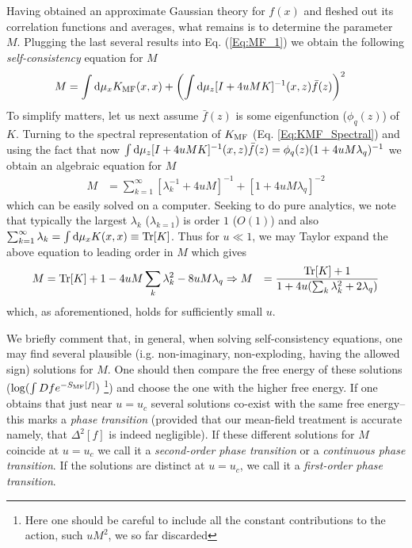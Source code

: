 Having obtained an approximate Gaussian theory for $f(x)$ and fleshed out its correlation functions and averages, what remains is to determine the parameter $M$. Plugging the last several results into Eq. (\ref{Eq:MF_1}) we obtain the following {\it self-consistency} equation for $M$ 
\begin{align}
M &= \int \text{d}\mu_{x} K_{\text{MF}}(x,x)+\left(\int \text{d}\mu_{z} [I+4uMK]^{-1}(x,z) \bar{f}(z)\right)^2
\end{align}
To simplify matters, let us next assume $\bar{f}(z)$ is some eigenfunction ($\phi_q(z)$) of $K$. Turning to the spectral representation of $K_{\text{MF}}$ (Eq. \ref{Eq:KMF_Spectral}) and using the fact that now $\int \text{d}\mu_{z} [I+4uMK]^{-1}(x,z) \bar{f}(z)=\phi_q(z) (1+4uM \lambda_q)^{-1}$ we obtain an  algebraic equation for $M$  
\begin{align}
M &= \sum_{k=1}^{\infty}[ \lambda_k^{-1} + 4u M]^{-1}+ [1+4uM \lambda_q]^{-2}
\end{align}
which can be easily solved on a computer. Seeking to do pure analytics, we note that typically the largest $\lambda_k$ ($\lambda_{k=1}$) is order $1$ ($O(1)$) and also $\sum_{k=1}^{\infty} \lambda_k=\int \text{d}\mu_x K(x,x)\equiv \text{Tr}[K]$. Thus for $u \ll 1$, we may Taylor expand the above equation to leading order in $M$ which gives 
\begin{align}
M &= \text{Tr}[K]+1 - 4uM \sum_k \lambda_k^2 -8 u M \lambda_q \Rightarrow M &= \frac{\text{Tr}[K]+1}{1+4u(\sum_k \lambda_k^2+2\lambda_q)}
\end{align}
which, as aforementioned, holds for sufficiently small $u$. 

We briefly comment that, in general, when solving self-consistency equations, one may find several plausible (i.g. non-imaginary, non-exploding, having the allowed sign) solutions for $M$. One should then compare the free energy of these solutions ($\log(\int Df e^{-S_{\text{MF}}[f]})$ \footnote{Here one should be careful to include all the constant contributions to the action, such $uM^2$, we so far discarded}) and choose the one with the higher free energy. If one obtains that just near $u=u_c$ several solutions co-exist with the same free energy-- this marks a {\it phase transition} (provided that our mean-field treatment is accurate namely, that $\Delta^2[f]$ is indeed negligible). If these different solutions for $M$ coincide at $u=u_c$ we call it a {\it second-order phase transition} or a {\it continuous phase transition}. If the solutions are distinct at $u=u_c$, we call it a {\it first-order phase transition}.  

